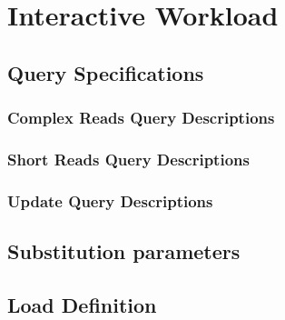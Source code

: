 \chapter{Interactive Workload}



\section{Query Specifications}

\subsection{Complex Reads Query Descriptions}
\label{sub:queries}

%
















\subsection{Short Reads Query Descriptions}



\subsection{Update Query Descriptions}



\section{Substitution parameters}\label{section:substitution}


\section{Load Definition}\label{section:workload}

